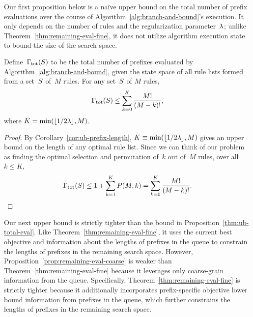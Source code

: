 Our first proposition below is a na\"ive upper bound on
the total number of prefix evaluations over the course of
Algorithm~\ref{alg:branch-and-bound}'s execution.
%
It only depends on the number of rules and
the regularization parameter~${\lambda}$;
\ie unlike Theorem~\ref{thm:remaining-eval-fine},
it does not utilize algorithm execution state to
bound the size of the search space.

\begin{proposition}
\label{thm:ub-total-eval}
Define~${\Gamma_{\textnormal{tot}}}(S)$ to be the total number of prefixes
evaluated by Algorithm~\ref{alg:branch-and-bound}, given the state space of
all rule lists formed from a set~$S$ of~$M$ rules.
%
For any set~$S$ of $M$ rules,
\begin{align}
\TotalRemaining(\RuleSet) \le \sum_{k=0}^K \frac{M!}{(M - k)!},
\label{eq:size-naive}
\end{align}
where ${K = \min(\lfloor 1/2 {\lambda} \rfloor, M)}$.
\end{proposition}

\begin{proof}
By Corollary~\ref{cor:ub-prefix-length},
${K \equiv \min(\lfloor 1 / 2 {\lambda} \rfloor, M)}$
gives an upper bound on the length of any optimal rule list.
%
Since we can think of our problem as finding the optimal
selection and permutation of~$k$ out of~$M$ rules,
over all~${k \le K}$,
\begin{align}
\TotalRemaining(\RuleSet) \le 1 + \sum_{k=1}^K P(M, k)
= \sum_{k=0}^K \frac{M!}{(M - k)!}.
\end{align}
\end{proof}

Our next upper bound is strictly tighter than the bound in
Proposition~\ref{thm:ub-total-eval}.
%
Like Theorem~\ref{thm:remaining-eval-fine}, it uses the
current best objective and information about
the lengths of prefixes in the queue to constrain
the lengths of prefixes in the remaining search space.
%
However, Proposition~\ref{prop:remaining-eval-coarse}
is weaker than Theorem~\ref{thm:remaining-eval-fine} because
it leverages only coarse-grain information from the queue.
%
Specifically, Theorem~\ref{thm:remaining-eval-fine} is
strictly tighter because it additionally incorporates
prefix-specific objective lower bound information from
prefixes in the queue, which further constrains
the lengths of prefixes in the remaining search space.

